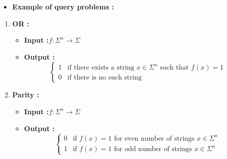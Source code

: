 \documentclass[12pt]{beamer}
\begin{document}
\begin{frame}
\begin{itemize}
\item\textbf{Example of query problems :}
\end{itemize}
 \begin{enumerate}
\item\textbf{OR :}

\begin{itemize}
\item\textbf{Input :}$f: \Sigma^n \rightarrow \Sigma$
\item\textbf{Output :} \[
\begin{cases}
    1 & \text{if there exists a string } x \in \Sigma^n \text{ such that } f(x) = 1 \\
    0 & \text{if there is no such string}
\end{cases}
\]
\end{itemize}

\item\textbf{Parity :}
\begin{itemize}
\item\textbf{Input :}$f: \Sigma^n \rightarrow \Sigma$
\item\textbf{Output :} \[
\begin{cases}
    0 & \text{if }f(x) = 1 \text{ for even number of strings } x \in \Sigma^n  \\
    1 & \text{if }f(x) = 1 \text{ for odd number of strings } x \in \Sigma^n
\end{cases}
\]
\end{itemize}
\end{enumerate}
\end{frame}
\end{document}
